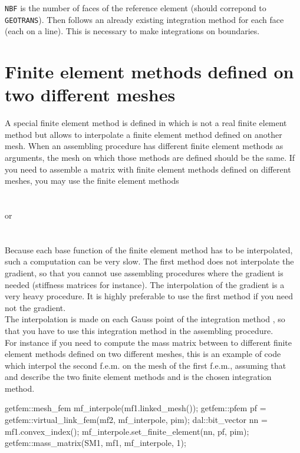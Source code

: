 \documentclass[11pt,a4paper]{article}
\begin{document}
{\tt NBF} is the number of faces of the reference element (should correpond to {\tt GEOTRANS}). Then follows an already existing integration method for each face (each on a line). This is necessary to make integrations on boundaries.

\section{Finite element methods defined on two different meshes}

A special finite element method is defined in  which is not a real finite element method but allows to interpolate a finite element method defined on another mesh. When an assembling procedure has different finite element methods as arguments, the mesh on which those methods are defined should be the same. If you need to assemble a matrix with finite element methods defined on different meshes, you may use the finite element methods\\[0.5cm]
 \\ \\[0.2cm]
or\\[0.2cm]
 \\ \\[0.5cm]
Because each base function of the finite element method has to be interpolated, such a computation can be very slow. The first method does not interpolate the gradient, so that you cannot use assembling procedures where the gradient is needed (stiffness matrices for instance). The interpolation of the gradient is a very heavy procedure. It is highly preferable to use the first method if you need not the gradient.\\[0.5cm]

The interpolation is made on each Gauss point of the integration method , so that you have to use this integration method in the assembling procedure.\\[0.5cm]

For instance if you need to compute the mass matrix between to different finite element methods defined on two different meshes, this is an example of code which interpol the second f.e.m. on the mesh of the first f.e.m., assuming that  and  describe the two finite element methods and  is the chosen integration method.\\[0.5cm]
\begin{cppcode}
  getfem::mesh\_fem mf\_interpole(mf1.linked\_mesh());
  getfem::pfem pf = getfem::virtual\_link\_fem(mf2, mf\_interpole, pim);
  dal::bit\_vector nn = mf1.convex\_index();
  mf\_interpole.set\_finite\_element(nn, pf, pim);
  getfem::mass\_matrix(SM1, mf1, mf\_interpole, 1);
\end{cppcode}
\end{document}
